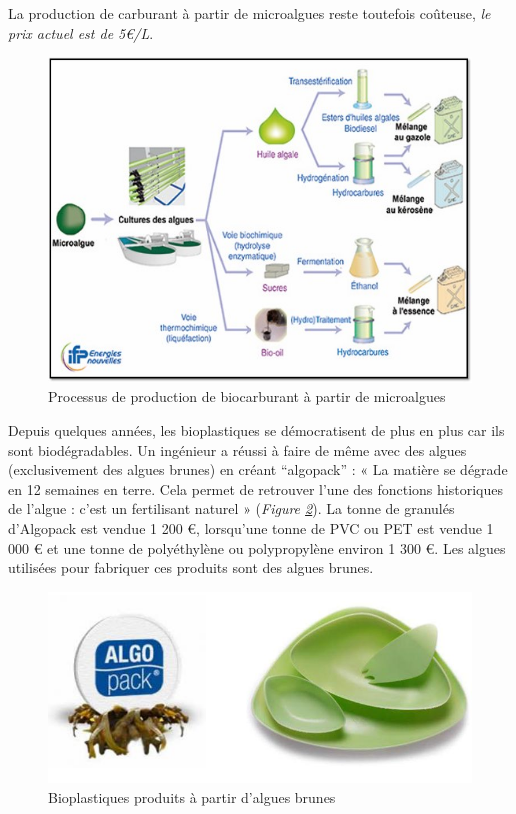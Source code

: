 \documentclass[
]{book}
\begin{document}
La production de carburant à partir de microalgues reste toutefois coûteuse, \emph{le prix actuel est de 5€/L}.

\begin{figure}

{\centering \includegraphics[width=7.49in]{images/biocarburant} 

}

\caption{Processus de production de biocarburant à partir de microalgues}\label{fig:biocarburant}
\end{figure}

Depuis quelques années, les bioplastiques se démocratisent de plus en plus car ils sont biodégradables. Un ingénieur a réussi à faire de même avec des algues (exclusivement des algues brunes) en créant ``algopack'' : « La matière se dégrade en 12 semaines en terre. Cela permet de retrouver l'une des fonctions historiques de l'algue : c'est un fertilisant naturel » (\emph{Figure \ref{fig:algopack}}).
La tonne de granulés d'Algopack est vendue 1 200 €, lorsqu'une tonne de PVC ou PET est vendue 1 000 € et une tonne de polyéthylène ou polypropylène environ 1 300 €. Les algues utilisées pour fabriquer ces produits sont des algues brunes.

\begin{figure}

{\centering \includegraphics[width=9.56in]{images/algopack} 

}

\caption{Bioplastiques produits à partir d'algues brunes}\label{fig:algopack}
\end{figure}
\end{document}
